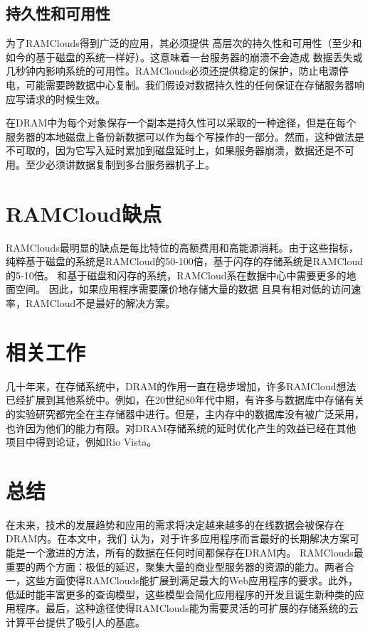 \documentclass[translation]{zjutreport}
\begin{document}
\section{持久性和可用性}
为了RAMClouds得到广泛的应用，其必须提供
高层次的持久性和可用性（至少和如今的基于磁盘的系统一样好）。这意味着一台服务器的崩溃不会造成
数据丢失或几秒钟内影响系统的可用性。RAMClouds必须还提供稳定的保护，防止电源停电，可能需要跨数据中心复制。我们假设对数据持久性的任何保证在存储服务器响应写请求的时候生效。

在DRAM中为每个对象保存一个副本是持久性可以采取的一种途径，但是在每个服务器的本地磁盘上备份新数据可以作为每个写操作的一部分。然而，这种做法是不可取的，因为它写入延时累加到磁盘延时上，如果服务器崩溃，数据还是不可用。至少必须讲数据复制到多台服务器机子上。

\chapter{RAMCloud缺点}
RAMClouds最明显的缺点是每比特位的高额费用和高能源消耗。由于这些指标，纯粹基于磁盘的系统是RAMCloud的50-100倍，基于闪存的存储系统是RAMCloud的5-10倍。
和基于磁盘和闪存的系统，RAMCloud系在数据中心中需要更多的地面空间。
因此，如果应用程序需要廉价地存储大量的数据
且具有相对低的访问速率，RAMCloud不是最好的解决方案。

\chapter{相关工作}
几十年来，在存储系统中，DRAM的作用一直在稳步增加，许多RAMCloud想法已经扩展到其他系统中。例如，在20世纪80年代中期，有许多与数据库中存储有关的实验研究都完全在主存储器中进行。但是，主内存中的数据库没有被广泛采用，也许因为他们的能力有限。对DRAM存储系统的延时优化产生的效益已经在其他项目中得到论证，例如Rio Vista。

\chapter{总结}
在未来，技术的发展趋势和应用的需求将决定越来越多的在线数据会被保存在DRAM内。在本文中，我们
认为，对于许多应用程序而言最好的长期​​解决方案可能是一个激进的方法，所有的数据在任何时间都保存在DRAM内。
RAMClouds最重要的两个方面：极低的延迟，聚集大量的商业型服务器的资源的能力。两者合一，这些方面使得RAMClouds能扩展到满足最大的Web应用程序的要求。此外，低延时能丰富更多的查询模型，这些模型会简化应用程序的开发且诞生新种类的应用程序。最后，这种途径使得RAMClouds能为需要灵活的可扩展的存储系统的云计算平台提供了吸引人的基底。

\backmatter %
\endgroup %

\clearpage %

\nocite{*}                                   %


\end{document}

